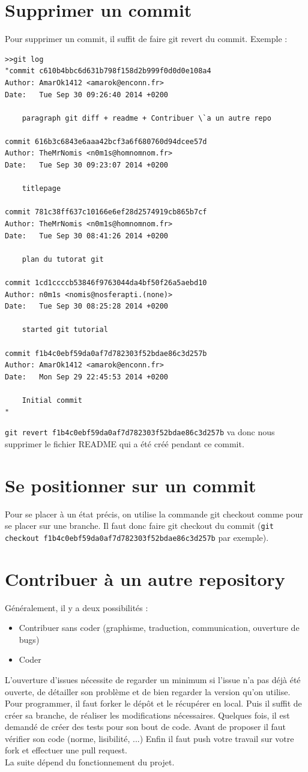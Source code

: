 \documentclass[a4paper,10pt]{report}
\begin{document}
  \section{Supprimer un commit}
  Pour supprimer un commit, il suffit de faire git revert \no du commit.
Exemple :
\begin{verbatim}
>>git log
"commit c610b4bbc6d631b798f158d2b999f0d0d0e108a4
Author: AmarOk1412 <amarok@enconn.fr>
Date:   Tue Sep 30 09:26:40 2014 +0200

    paragraph git diff + readme + Contribuer \`a un autre repo

commit 616b3c6843e6aaa42bcf3a6f680760d94dcee57d
Author: TheMrNomis <n0m1s@homnomnom.fr>
Date:   Tue Sep 30 09:23:07 2014 +0200

    titlepage

commit 781c38ff637c10166e6ef28d2574919cb865b7cf
Author: TheMrNomis <n0m1s@homnomnom.fr>
Date:   Tue Sep 30 08:41:26 2014 +0200

    plan du tutorat git

commit 1cd1ccccb53846f9763044da4bf50f26a5aebd10
Author: n0m1s <nomis@nosferapti.(none)>
Date:   Tue Sep 30 08:25:28 2014 +0200

    started git tutorial

commit f1b4c0ebf59da0af7d782303f52bdae86c3d257b
Author: AmarOk1412 <amarok@enconn.fr>
Date:   Mon Sep 29 22:45:53 2014 +0200

    Initial commit
"
\end{verbatim}
\verb|git revert f1b4c0ebf59da0af7d782303f52bdae86c3d257b| va donc nous supprimer le fichier README qui a \'et\'e cr\'e\'e pendant ce commit.
  \section{Se positionner sur un commit}
  Pour se placer \`a un \'etat pr\'ecis, on utilise la commande git checkout comme pour se placer sur une branche. Il faut donc faire git checkout \no du commit (\verb|git checkout f1b4c0ebf59da0af7d782303f52bdae86c3d257b| par exemple).
  \section{Contribuer \`a un autre repository}
G\'en\'eralement, il y a deux possibilit\'es : 
\begin{itemize}
\item Contribuer sans coder (graphisme, traduction, communication, ouverture de bugs)
\item Coder
\end{itemize}
L'ouverture d'issues n\'ecessite de regarder un minimum si l'issue n'a pas d\'ej\`a \'et\'e ouverte, de d\'etailler son probl\`eme et de bien regarder la version qu'on utilise.\\
Pour programmer, il faut forker le d\'ep\^ot et le r\'ecup\'erer en local.
Puis il suffit de cr\'eer sa branche, de r\'ealiser les modifications n\'ecessaires.
Quelques fois, il est demand\'e de cr\'eer des tests pour son bout de code.
Avant de proposer il faut v\'erifier son code (norme, lisibilit\'e, ...)
Enfin il faut push votre travail sur votre fork et effectuer une pull request.\\
La suite d\'epend du fonctionnement du projet.
\end{document}
